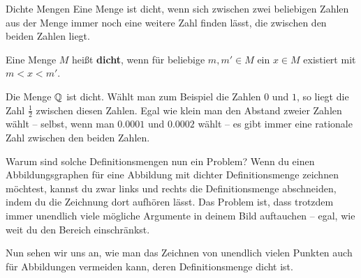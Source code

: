 \documentclass[../../main.tex]{subfiles}
\begin{document}
\begin{advanced}{Dichte Mengen}
    Eine Menge ist dicht, wenn sich zwischen zwei beliebigen Zahlen aus der Menge immer noch eine weitere Zahl finden lässt, die zwischen den beiden Zahlen liegt.
    
    \begin{definition}
        Eine Menge $M$ heißt \textbf{dicht}, wenn für beliebige $m,m'\in M$ ein $x\in M$ existiert mit $m<x<m'$.
    \end{definition}
    
    \begin{advexample}
        Die Menge $\mathbb{Q}$ ist dicht. Wählt man zum Beispiel die Zahlen $0$ und $1$, so liegt die Zahl $\frac{1}{2}$ zwischen diesen Zahlen. Egal wie klein man den Abstand zweier Zahlen wählt -- selbst, wenn man $0.0001$ und $0.0002$ wählt -- es gibt immer eine rationale Zahl zwischen den beiden Zahlen.
    \end{advexample}
\end{advanced}

Warum sind solche Definitionsmengen nun ein Problem? Wenn du einen Abbildungsgraphen für eine Abbildung mit dichter Definitionsmenge zeichnen möchtest, kannst du zwar links und rechts die Definitionsmenge abschneiden, indem du die Zeichnung dort aufhören lässt. Das Problem ist, dass trotzdem immer unendlich viele mögliche Argumente in deinem Bild auftauchen -- egal, wie weit du den Bereich einschränkst.

Nun sehen wir uns an, wie man das Zeichnen von unendlich vielen Punkten auch für Abbildungen vermeiden kann, deren Definitionsmenge dicht ist.
\end{document}
